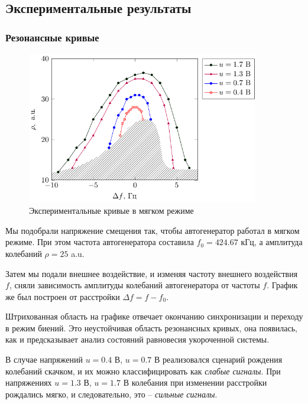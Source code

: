 \documentclass[a4paper,14pt]{extarticle}
\begin{document}
\subsection{Экспериментальные результаты}
\subsubsection{Резонансные кривые}
\begin{figure}[h!]
	\centering
	\includegraphics[width=0.9\textwidth]{plot/test}
	\vspace{-1em}
	\caption{Экспериментальные кривые в мягком режиме}
	\label{fig:figure1}
\end{figure}


Мы подобрали напряжение смещения так, чтобы автогенератор работал в мягком режиме. При этом частота автогенератора составила $f_0=424.67$ кГц, а амплитуда колебаний $\rho = 25$ a.u. 

Затем мы подали внешнее воздействие, и изменяя частоту внешнего воздействия $f$, сняли зависимость амплитуды колебаний автогенератора от частоты $f$. График же был построен от расстройки $\Delta f=f-f_0$.

Штрихованная область на графике отвечает окончанию синхронизации и переходу в режим биений. Это неустойчивая область резонансных кривых, она появилась, как и предсказывает анализ состояний равновесия укороченной системы.

В случае напряжений $u=0.4$ В, $u=0.7$ В реализовался сценарий рождения колебаний  скачком, и их можно классифицировать как \textit{слабые сигналы}. При напряжениях $u=1.3$ В, $u=1.7$ В колебания при изменении расстройки рождались мягко, и следовательно, это -- \textit{сильные сигналы}.
\end{document}
